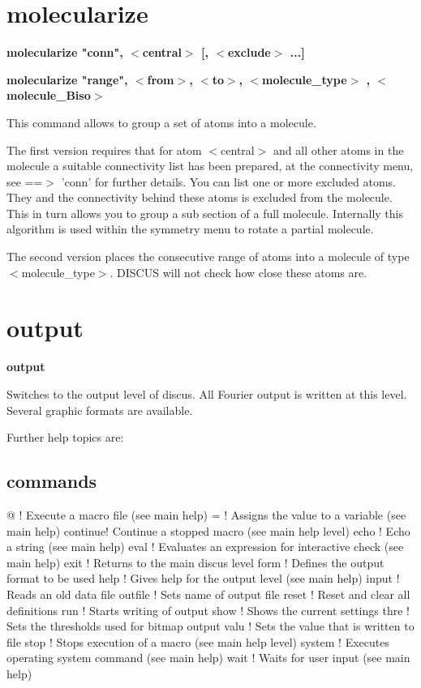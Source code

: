 \section{molecularize}
{\bf molecularize "conn", $ <$central$> $ [, $ <$exclude$> $ ...] \par }
{\bf molecularize "range", $ <$from$> $, $ <$to$> $, $ <$molecule\_type$> $ , $ <$molecule\_Biso$> $ \par }
\par
\vspace{3pt}
This command allows to group a set of atoms into a molecule. 
\par
The first version requires that for atom $ <$central$> $ and all other 
atoms in the molecule a suitable connectivity list has been prepared, 
at the connectivity menu, see ==$> $ 'conn' for further details. 
You can list  one or more excluded atoms. They and the connectivity 
behind these atoms is excluded from the molecule. This in turn 
allows you to group a sub section of a full molecule. 
Internally this algorithm is used within the symmetry menu to 
rotate a partial molecule. 
\par
The second version places the consecutive range of atoms into 
a molecule of type $ <$molecule\_type$> $. 
DISCUS will not check how close these atoms are. 
\section{output}
{\bf output \par }
\par
\vspace{3pt}
Switches to the output level of discus. All Fourier output is written 
at this level. Several graphic formats are available. 
\par
Further help topics are: 
\par
\subsection*{commands}
\par
\begin{MacVerbatim}
@       ! Execute a macro file (see main help)
=       ! Assigns the value to a variable (see main help)
continue! Continue a stopped macro (see main help level)
echo    ! Echo a string (see main help)
eval    ! Evaluates an expression for interactive check (see main help)
exit    ! Returns to the main discus level
form    ! Defines the output format to be used
help    ! Gives help for the output level (see main help)
input   ! Reads an old data file
outfile ! Sets name of output file
reset   ! Reset and clear all definitions
run     ! Starts writing of output
show    ! Shows the current settings
thre    ! Sets the thresholds used for bitmap output
valu    ! Sets the value that is written to file
stop    ! Stops execution of a macro (see main help level)
system  ! Executes operating system command (see main help)
wait    ! Waits for user input (see main help)
\end{MacVerbatim}
